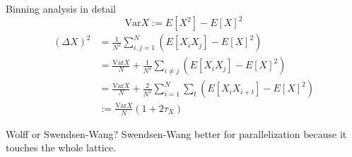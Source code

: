 \documentclass[handout]{beamer}
\begin{document}
\begin{frame}{Binning analysis in detail}
\[ \text{Var} X := E \left[ X^2 \right] - E \left[ X \right]^2 \]
\begin{align*}
(\Delta X)^2 &= \frac{1}{N^2} \sum\limits_{i,j=1}^N \left( E \left[ X_i X_j \right] - E \left[ X \right]^2 \right) \\
&= \frac{\text{Var}X}{N}+\frac{1}{N^2}\sum\limits_{i\neq j} \left( E \left[X_i X_j \right] - E \left[ X \right]^2 \right) \\
&= \frac{\text{Var}X}{N}+\frac{2}{N^2}\sum\limits_{i=1}^N \sum\limits_t \left( E\left[X_i X_{i+t} \right] - E \left[ X \right]^2 \right) \\
&:= \frac{\text{Var}X}{N}\left(1+2\tau_X\right)
\end{align*}
\end{frame}

\begin{frame}{Wolff or Swendsen-Wang?}
Swendsen-Wang better for parallelization because it touches the whole lattice.
\note{ }
\end{frame}
\end{document}

